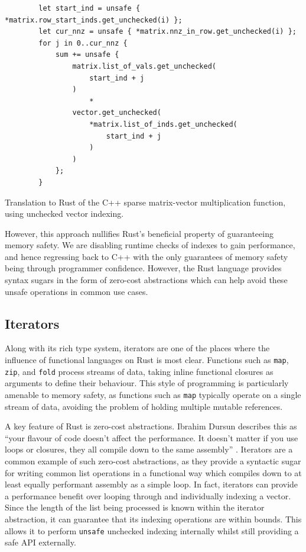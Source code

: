 \begin{code}
    \begin{verbatim}
        let start_ind = unsafe { *matrix.row_start_inds.get_unchecked(i) };
        let cur_nnz = unsafe { *matrix.nnz_in_row.get_unchecked(i) };
        for j in 0..cur_nnz {
            sum += unsafe {
                matrix.list_of_vals.get_unchecked(
                    start_ind + j
                )
                    *
                vector.get_unchecked(
                    *matrix.list_of_inds.get_unchecked(
                        start_ind + j
                    )
                )
            };
        }
    \end{verbatim}
    \caption{Translation to Rust of the C++ sparse matrix-vector multiplication function, using unchecked vector indexing.}
    \label{listing:rust-sparsemv-unchecked}
\end{code}

However, this approach nullifies Rust's beneficial property of guaranteeing memory safety. We are disabling runtime checks of indexes to gain performance, and hence regressing back to C++ with the only guarantees of memory safety being through programmer confidence. However, the Rust language provides syntax sugars in the form of zero-cost abstractions which can help avoid these unsafe operations in common use cases.

\subsection{Iterators}
\label{sec:translation-iterators}

Along with its rich type system, iterators are one of the places where the influence of functional languages on Rust is most clear. Functions such as \texttt{map}, \texttt{zip}, and \texttt{fold} process streams of data, taking inline functional closures as arguments to define their behaviour. This style of programming is particularly amenable to memory safety, as functions such as \texttt{map} typically operate on a single stream of data, avoiding the problem of holding multiple mutable references.

A key feature of Rust is zero-cost abstractions. Ibrahim Dursun describes this as ``your flavour of code doesn’t affect the performance. It doesn’t matter if you use loops or closures, they all compile down to the same assembly'' \cite{RustZeroCost2020}. Iterators are a common example of such zero-cost abstractions, as they provide a syntactic sugar for writing common list operations in a functional way which compiles down to at least equally performant assembly as a simple loop. In fact, iterators can provide a performance benefit over looping through and individually indexing a vector. Since the length of the list being processed is known within the iterator abstraction, it can guarantee that its indexing operations are within bounds. This allows it to perform \texttt{unsafe} unchecked indexing internally whilst still providing a safe API externally.

